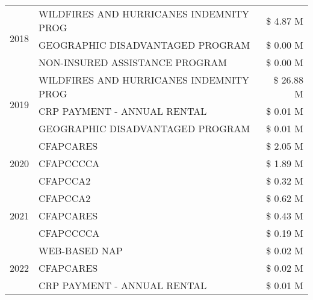 \begin{tabular}{llr}
\cline{1-3}
\multirow[t]{3}{*}{2018} & WILDFIRES AND HURRICANES INDEMNITY PROG & \$ 4.87 M \\
 & GEOGRAPHIC DISADVANTAGED PROGRAM & \$ 0.00 M \\
 & NON-INSURED ASSISTANCE PROGRAM & \$ 0.00 M \\
\cline{1-3}
\multirow[t]{3}{*}{2019} & WILDFIRES AND HURRICANES INDEMNITY PROG & \$ 26.88 M \\
 & CRP PAYMENT - ANNUAL RENTAL & \$ 0.01 M \\
 & GEOGRAPHIC DISADVANTAGED PROGRAM & \$ 0.01 M \\
\cline{1-3}
\multirow[t]{3}{*}{2020} & CFAPCARES & \$ 2.05 M \\
 & CFAPCCCCA & \$ 1.89 M \\
 & CFAPCCA2 & \$ 0.32 M \\
\cline{1-3}
\multirow[t]{3}{*}{2021} & CFAPCCA2 & \$ 0.62 M \\
 & CFAPCARES & \$ 0.43 M \\
 & CFAPCCCCA & \$ 0.19 M \\
\cline{1-3}
\multirow[t]{3}{*}{2022} & WEB-BASED NAP & \$ 0.02 M \\
 & CFAPCARES & \$ 0.02 M \\
 & CRP PAYMENT - ANNUAL RENTAL & \$ 0.01 M \\
\cline{1-3}
\bottomrule
\end{tabular}
